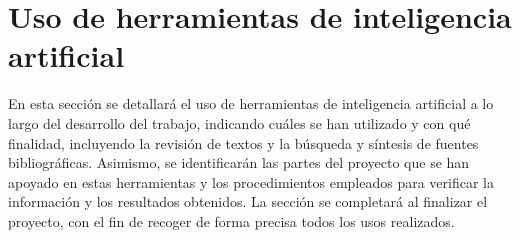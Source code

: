 \section{Uso de herramientas de inteligencia artificial}
\label{sec:uso-ia}

En esta sección se detallará el uso de herramientas de inteligencia artificial a lo largo del desarrollo del trabajo, indicando cuáles se han utilizado y con qué finalidad, incluyendo la revisión de textos y la búsqueda y síntesis de fuentes bibliográficas. Asimismo, se identificarán las partes del proyecto que se han apoyado en estas herramientas y los procedimientos empleados para verificar la información y los resultados obtenidos. La sección se completará al finalizar el proyecto, con el fin de recoger de forma precisa todos los usos realizados.

%
%
